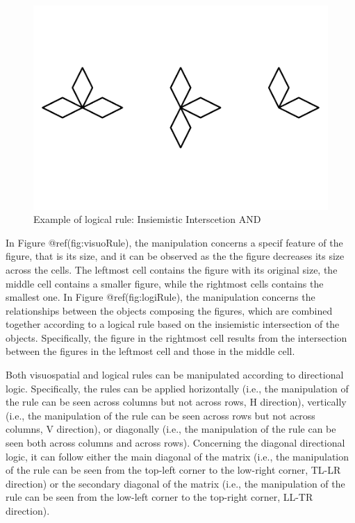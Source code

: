 \documentclass[
]{article}
\begin{document}
\begin{figure}

{\centering \includegraphics[width=0.7\linewidth]{paper-pdf_files/figure-latex/logiRule-1} 

}

\caption{Example of logical rule: Insiemistic Interscetion AND}\label{fig:logiRule}
\end{figure}

In Figure @ref(fig:visuoRule), the manipulation concerns a specif
feature of the figure, that is its size, and it can be observed as the
the figure decreases its size across the cells. The leftmost cell
contains the figure with its original size, the middle cell contains a
smaller figure, while the rightmost cells contains the smallest one. In
Figure @ref(fig:logiRule), the manipulation concerns the relationships
between the objects composing the figures, which are combined together
according to a logical rule based on the insiemistic intersection of the
objects. Specifically, the figure in the rightmost cell results from the
intersection between the figures in the leftmost cell and those in the
middle cell.

Both visuospatial and logical rules can be manipulated according to
directional logic. Specifically, the rules can be applied horizontally
(i.e., the manipulation of the rule can be seen across columns but not
across rows, H direction), vertically (i.e., the manipulation of the
rule can be seen across rows but not across columns, V direction), or
diagonally (i.e., the manipulation of the rule can be seen both across
columns and across rows). Concerning the diagonal directional logic, it
can follow either the main diagonal of the matrix (i.e., the
manipulation of the rule can be seen from the top-left corner to the
low-right corner, TL-LR direction) or the secondary diagonal of the
matrix (i.e., the manipulation of the rule can be seen from the low-left
corner to the top-right corner, LL-TR direction).
\end{document}
